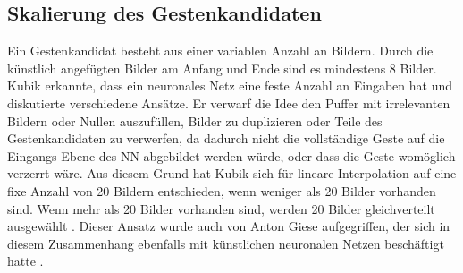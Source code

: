 \subsection{Skalierung des Gestenkandidaten}
\label{sec:scaling}
Ein Gestenkandidat besteht aus einer variablen Anzahl an Bildern. Durch die künstlich angefügten Bilder am Anfang und Ende sind es mindestens 8 Bilder. Kubik erkannte, dass ein neuronales Netz eine feste Anzahl an
Eingaben hat und diskutierte verschiedene Ansätze.
\newline
\newline
Er verwarf die Idee den Puffer mit irrelevanten Bildern oder Nullen auszufüllen, Bilder zu duplizieren oder Teile des Gestenkandidaten zu verwerfen, da dadurch
nicht die vollständige Geste auf die Eingangs-Ebene des NN abgebildet werden würde, oder dass die Geste womöglich verzerrt wäre.
\newline
\newline
Aus diesem Grund hat Kubik sich für lineare Interpolation auf eine fixe Anzahl von 20 Bildern entschieden, wenn weniger als 20 Bilder vorhanden sind. Wenn mehr als 20 Bilder vorhanden sind,
werden 20 Bilder gleichverteilt ausgewählt \cite{kubikThesis}. Dieser Ansatz wurde auch von Anton Giese aufgegriffen, der sich in diesem Zusammenhang ebenfalls mit künstlichen neuronalen Netzen
beschäftigt hatte \cite{gieseThesis}.